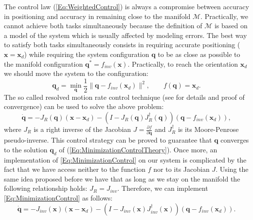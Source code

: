 \documentclass[conference]{IEEEtran}
\numberwithin{equation}{section}
\newcommand{\q}{\mathbf{q}}
\newcommand{\x}{\mathbf{x}}
\begin{document}
The control law (\ref{Eq:WeightedControl}) is always a compromise between accuracy in positioning and accuracy in remaining close to the manifold $\mathcal M$. Practically, we cannot achieve both tasks simultaneously because the definition of $\mathcal M$ is based on a model of the system which is usually affected by modeling errors. The best way to satisfy both tasks simultaneously consists in requiring accurate positioning ($\x=\x_d$) while requiring the system configuration $\q$ to be as close as possible to the manifold configuration $\q^* = f_{inv}(\x)$. Practically, to reach the orientation $\x_d$ we should move the system to the configuration:
\begin{equation} \label{Eq:MinimizationControlTheory}
\q_d = \min_{\q} \frac{1}{2}\| \q - f_{inv}(\x_d)\|^2, \qquad f(\q) = \x_d.
\end{equation}
The so called resolved motion rate control technique (see \cite{SamsonEspiau} for details and proof of convergence) can be used to solve the above problem:
\begin{equation} \label{Eq:MinimizationControl}
\dot{\q} = -J_R(\q) (\x-\x_d) - \left(I-J_R(\q) J_R^\dagger(\q)\right) \left(\q - f_{inv}(\x_d)\right),
\end{equation}
where $J_R$ is a right inverse of the Jacobian $J = \frac{\partial f}{\partial \q}$ and $J_R^\dagger$ is its Moore-Penrose pseudo-inverse. This control strategy can be proved to guarantee that $\q$ converges to the solution $\q_d$ of (\ref{Eq:MinimizationControlTheory}). Once more, an implementation of \eqref{Eq:MinimizationControl} on our system is complicated by the fact that we have access neither to the function $f$ nor to its Jacobian $J$. Using the same idea proposed before we have that as long as we stay on the manifold the following relationship holds: $J_R = J_{inv}$. Therefore, we can implement \eqref{Eq:MinimizationControl} as follows:
\begin{equation} \label{Eq:MinimizationControl2}
\dot{\q} = -J_{inv}(\x) (\x-\x_d) - \left(I-J_{inv}(\x) J_{inv}^\dagger(\x)\right) \left(\q - f_{inv}(\x_d)\right).
\end{equation}
\end{document}
